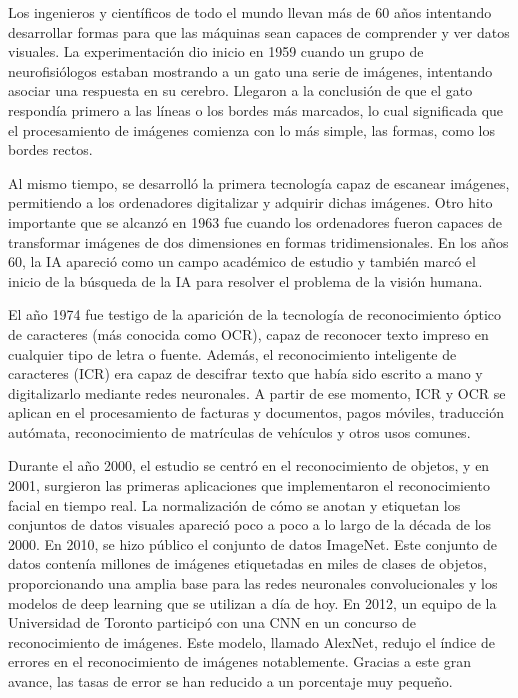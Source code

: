 Los ingenieros y científicos de todo el mundo llevan más de 60 años intentando desarrollar formas para que las máquinas sean capaces de comprender y ver datos visuales. La experimentación dio inicio en 1959 cuando un grupo de neurofisiólogos estaban mostrando a un gato una serie de imágenes, intentando asociar una respuesta en su cerebro. Llegaron a la conclusión de que el gato respondía primero a las líneas o los bordes más marcados, lo cual significada que el procesamiento de imágenes comienza con lo más simple, las formas, como los bordes rectos. \cite{historia}

Al mismo tiempo, se desarrolló la primera tecnología capaz de escanear imágenes, permitiendo a los ordenadores digitalizar y adquirir dichas imágenes. Otro hito importante que se alcanzó en 1963 fue cuando los ordenadores fueron capaces de transformar imágenes de dos dimensiones en formas tridimensionales. En los años 60, la IA apareció como un campo académico de estudio y también marcó el inicio de la búsqueda de la IA para resolver el problema de la visión humana.

El año 1974 fue testigo de la aparición de la tecnología de reconocimiento óptico de caracteres (más conocida como OCR), capaz de reconocer texto impreso en cualquier tipo de letra o fuente. Además, el reconocimiento inteligente de caracteres (ICR) era capaz de descifrar texto que había sido escrito a mano y digitalizarlo mediante redes neuronales. A partir de ese momento, ICR y OCR se aplican en el procesamiento de facturas y documentos, pagos móviles, traducción autómata, reconocimiento de matrículas de vehículos y otros usos comunes.

Durante el año 2000, el estudio se centró en el reconocimiento de objetos, y en 2001, surgieron las primeras aplicaciones que implementaron el reconocimiento facial en tiempo real. La normalización de cómo se anotan y etiquetan los conjuntos de datos visuales apareció poco a poco a lo largo de la década de los 2000. En 2010, se hizo público el conjunto de datos ImageNet. Este conjunto de datos contenía millones de imágenes etiquetadas en miles de clases de objetos, proporcionando una amplia base para las redes neuronales convolucionales y los modelos de deep learning que se utilizan a día de hoy. En 2012, un equipo de la Universidad de Toronto participó con una CNN en un concurso de reconocimiento de imágenes. Este modelo, llamado AlexNet, redujo el índice de errores en el reconocimiento de imágenes notablemente. Gracias a este gran avance, las tasas de error se han reducido a un porcentaje muy pequeño.

